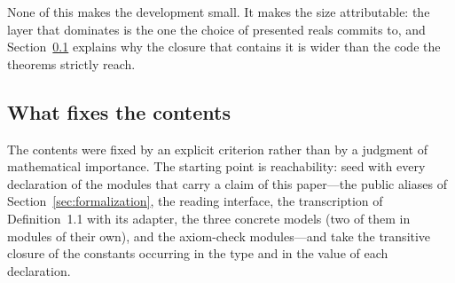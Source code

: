 \documentclass[11pt]{article}
\theoremstyle{definition}
\theoremstyle{remark}
\begin{document}
None of this makes the development small.  It makes the size attributable: the layer
that dominates is the one the choice of presented reals commits to, and
Section~\ref{sec:cost-contents} explains why the closure that contains it is wider
than the code the theorems strictly reach.

\subsection{What fixes the contents}
\label{sec:cost-contents}

The contents were fixed by an explicit criterion rather than by a judgment of mathematical importance.  The starting point is reachability: seed with every declaration of the modules that carry a claim of this paper---the public aliases of Section~\ref{sec:formalization}, the reading interface, the transcription of Definition~1.1 with its adapter, the three concrete models (two of them in modules of their own), and the axiom-check modules---and take the transitive closure of the constants occurring in the type and in the value of each declaration.
\end{document}
